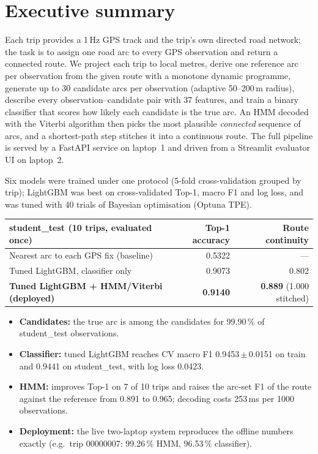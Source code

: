 \section*{Executive summary}
Each trip provides a 1\,Hz GPS track and the trip's own directed road network; the task is to assign one road arc to
every GPS observation and return a connected route. We project each trip to local metres, derive one reference arc per
observation from the given route with a monotone dynamic programme, generate up to 30 candidate arcs per observation
(adaptive 50--200\,m radius), describe every observation--candidate pair with 37 features, and train a binary
classifier that scores how likely each candidate is the true arc. An HMM decoded with the Viterbi algorithm then picks
the most plausible \emph{connected} sequence of arcs, and a shortest-path step stitches it into a continuous route. The
full pipeline is served by a FastAPI service on laptop~1 and driven from a Streamlit evaluator UI on laptop~2.

Six models were trained under one protocol (5-fold cross-validation grouped by trip); LightGBM was best on cross-validated
Top-1, macro F1 and log loss, and was tuned with 40 trials of Bayesian optimisation (Optuna TPE).

\begin{center}
\small
\begin{tabular}{@{}lrr@{}}
\toprule
\textbf{student\_test (10 trips, evaluated once)} & \textbf{Top-1 accuracy} & \textbf{Route continuity} \\
\midrule
Nearest arc to each GPS fix (baseline) & 0.5322 & --- \\
Tuned LightGBM, classifier only & 0.9073 & 0.802 \\
\textbf{Tuned LightGBM + HMM/Viterbi (deployed)} & \textbf{0.9140} & \textbf{0.889}\; (1.000 stitched) \\
\bottomrule
\end{tabular}
\end{center}

\begin{itemize}
\item \textbf{Candidates:} the true arc is among the candidates for 99.90\,\% of student\_test observations.
\item \textbf{Classifier:} tuned LightGBM reaches CV macro F1 0.9453\,$\pm$\,0.0151 on train and 0.9441 on
student\_test, with log loss 0.0423.
\item \textbf{HMM:} improves Top-1 on 7 of 10 trips and raises the arc-set F1 of the route against the reference from
0.891 to 0.965; decoding costs 253\,ms per 1000 observations.
\item \textbf{Deployment:} the live two-laptop system reproduces the offline numbers exactly (e.g.\ trip 00000007: 99.26\,\%
HMM, 96.53\,\% classifier).
\end{itemize}

\newpage
{\hypersetup{linkcolor=black}\tableofcontents}
\newpage
